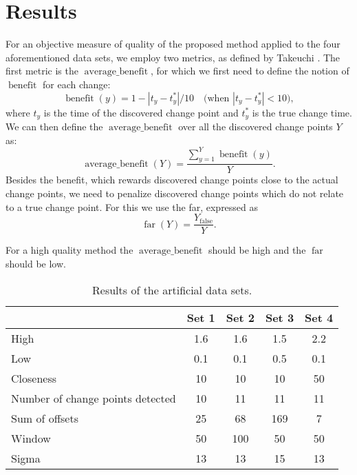 \section{Results}\label{sec:artificial_data_results}
For an objective measure of quality of the proposed method applied to the four aforementioned data sets, we employ two metrics, as defined by Takeuchi \etal \cite{takeuchi2006unifying}.
The first metric is the $\operatorname*{average \_ benefit}$, for which we first need to define the notion of $\operatorname*{benefit}$ for each change:
\begin{equation}\label{eq:benefit}
  \operatorname*{benefit}(y) = 1 - |t_y - t_y^*| / 10  \mbox{~~~(when } |t_y - t_y^*| < 10 \mbox{)},
\end{equation}
where $t_y$ is the time of the discovered change point and $t_y^*$ is the true change time.
We can then define the $\operatorname*{average \_ benefit}$ over all the discovered change points $Y$ as:
\begin{equation}\label{eq:average_benefit}
  \operatorname*{average \_ benefit}(Y) = \frac{\sum_{y=1}^Y \operatorname*{benefit}(y)}{Y}.
\end{equation}
Besides the benefit, which rewards discovered change points close to the actual change points, we need to penalize discovered change points which do not relate to a true change point.
For this we use the \acrlong{far}, expressed as
\begin{equation}\label{eq:false_alarm_rate}
  \operatorname*{far}(Y) = \frac{Y_{\operatorname*{false}}}{Y}.
\end{equation}

For a high quality method the $\operatorname*{average\_benefit}$ should be high and the $\operatorname*{far}$ should be low.


\begin{table}
  \centering
  \begin{tabulary}{\textwidth}{|l|c|c|c|c|}
     & Set 1 & Set 2 & Set 3 & Set 4 \\
    \hline
    High & 1.6 & 1.6 & 1.5 & 2.2 \\
    \hline
    Low & 0.1 & 0.1 & 0.5 & 0.1 \\
    \hline
    Closeness & 10 & 10 & 10 & 50 \\
    \hline
    Number of change points detected & 10 & 11 & 11 & 11 \\
    \hline
    Sum of offsets & 25 & 68 & 169 & 7 \\
    \hline
    Window & 50 & 100 & 50 & 50 \\
    \hline
    Sigma & 13 & 13 & 15 & 13 \\
    \hline
  \end{tabulary}
  \caption[Results artificial data sets]{Results of the artificial data sets.}
  \label{tab:results_artificial}
\end{table}

